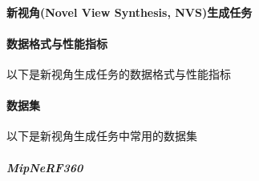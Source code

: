 \paragraph{新视角(Novel View Synthesis, NVS)生成任务}





\paragraph{数据格式与性能指标}

以下是新视角生成任务的数据格式与性能指标

\paragraph{数据集}

以下是新视角生成任务中常用的数据集

\subparagraph{MipNeRF360}

